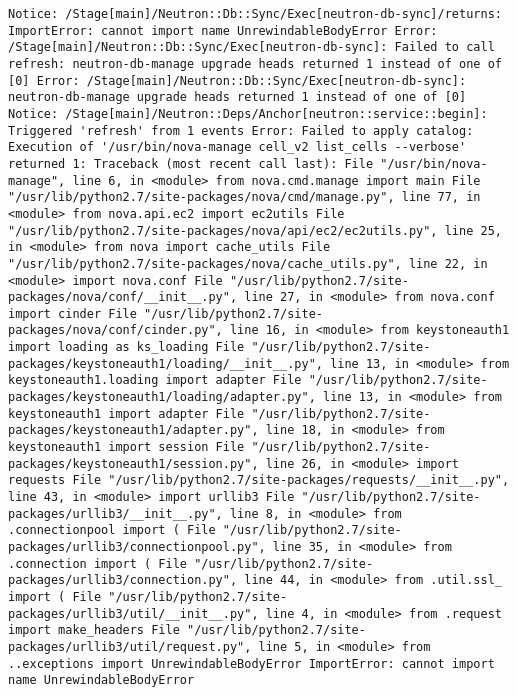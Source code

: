 \documentclass[
  letterpaper,
  DIV=11,
  numbers=noendperiod]{scrreprt}
\begin{document}
\begin{verbatim}
Notice: /Stage[main]/Neutron::Db::Sync/Exec[neutron-db-sync]/returns: ImportError: cannot import name UnrewindableBodyError Error: /Stage[main]/Neutron::Db::Sync/Exec[neutron-db-sync]: Failed to call refresh: neutron-db-manage upgrade heads returned 1 instead of one of [0] Error: /Stage[main]/Neutron::Db::Sync/Exec[neutron-db-sync]: neutron-db-manage upgrade heads returned 1 instead of one of [0] Notice: /Stage[main]/Neutron::Deps/Anchor[neutron::service::begin]: Triggered 'refresh' from 1 events Error: Failed to apply catalog: Execution of '/usr/bin/nova-manage cell_v2 list_cells --verbose' returned 1: Traceback (most recent call last): File "/usr/bin/nova-manage", line 6, in <module> from nova.cmd.manage import main File "/usr/lib/python2.7/site-packages/nova/cmd/manage.py", line 77, in <module> from nova.api.ec2 import ec2utils File "/usr/lib/python2.7/site-packages/nova/api/ec2/ec2utils.py", line 25, in <module> from nova import cache_utils File "/usr/lib/python2.7/site-packages/nova/cache_utils.py", line 22, in <module> import nova.conf File "/usr/lib/python2.7/site-packages/nova/conf/__init__.py", line 27, in <module> from nova.conf import cinder File "/usr/lib/python2.7/site-packages/nova/conf/cinder.py", line 16, in <module> from keystoneauth1 import loading as ks_loading File "/usr/lib/python2.7/site-packages/keystoneauth1/loading/__init__.py", line 13, in <module> from keystoneauth1.loading import adapter File "/usr/lib/python2.7/site-packages/keystoneauth1/loading/adapter.py", line 13, in <module> from keystoneauth1 import adapter File "/usr/lib/python2.7/site-packages/keystoneauth1/adapter.py", line 18, in <module> from keystoneauth1 import session File "/usr/lib/python2.7/site-packages/keystoneauth1/session.py", line 26, in <module> import requests File "/usr/lib/python2.7/site-packages/requests/__init__.py", line 43, in <module> import urllib3 File "/usr/lib/python2.7/site-packages/urllib3/__init__.py", line 8, in <module> from .connectionpool import ( File "/usr/lib/python2.7/site-packages/urllib3/connectionpool.py", line 35, in <module> from .connection import ( File "/usr/lib/python2.7/site-packages/urllib3/connection.py", line 44, in <module> from .util.ssl_ import ( File "/usr/lib/python2.7/site-packages/urllib3/util/__init__.py", line 4, in <module> from .request import make_headers File "/usr/lib/python2.7/site-packages/urllib3/util/request.py", line 5, in <module> from ..exceptions import UnrewindableBodyError ImportError: cannot import name UnrewindableBodyError
\end{verbatim}
\end{document}
